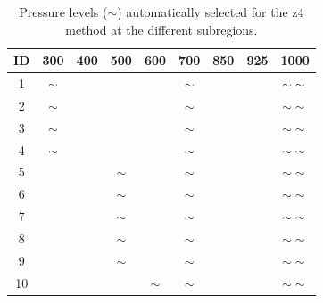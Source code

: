 \documentclass[twocol]{ametsoc}
\begin{document}
\begin{table}[htbp]
	\footnotesize
	\caption{Pressure levels ($\sim$) automatically selected for the z4 method at the different subregions.}
	\begin{center}
		\begin{tabular}{ccccccccc}
			\hline \textbf{ID} & \textbf{300} & \textbf{400} & \textbf{500} & \textbf{600} & \textbf{700} & \textbf{850} & \textbf{925} & \textbf{1000} \\ 
			\hline 
			1  & $\sim$ &   &   &   & $\sim$ &   &   & $\sim \sim$ \\
			2  & $\sim$ &   &   &   & $\sim$ &   &   & $\sim \sim$ \\
			3  & $\sim$ &   &   &   & $\sim$ &   &   & $\sim \sim$ \\
			4  & $\sim$ &   &   &   & $\sim$ &   &   & $\sim \sim$ \\
			5  &   &   & $\sim$ &   & $\sim$ &   &   & $\sim \sim$ \\
			6  &   &   & $\sim$ &   & $\sim$ &   &   & $\sim \sim$ \\
			7  &   &   & $\sim$ &   & $\sim$ &   &   & $\sim \sim$ \\
			8  &   &   & $\sim$ &   & $\sim$ &   &   & $\sim \sim$ \\
			9  &   &   & $\sim$ &   & $\sim$ &   &   & $\sim \sim$ \\
			10 &   &   &   & $\sim$ & $\sim$ &   &   & $\sim \sim$ \\
			\hline 
		\end{tabular} 
	\end{center}
	\label{table:levels_GA_z4}
\end{table}
\end{document}
